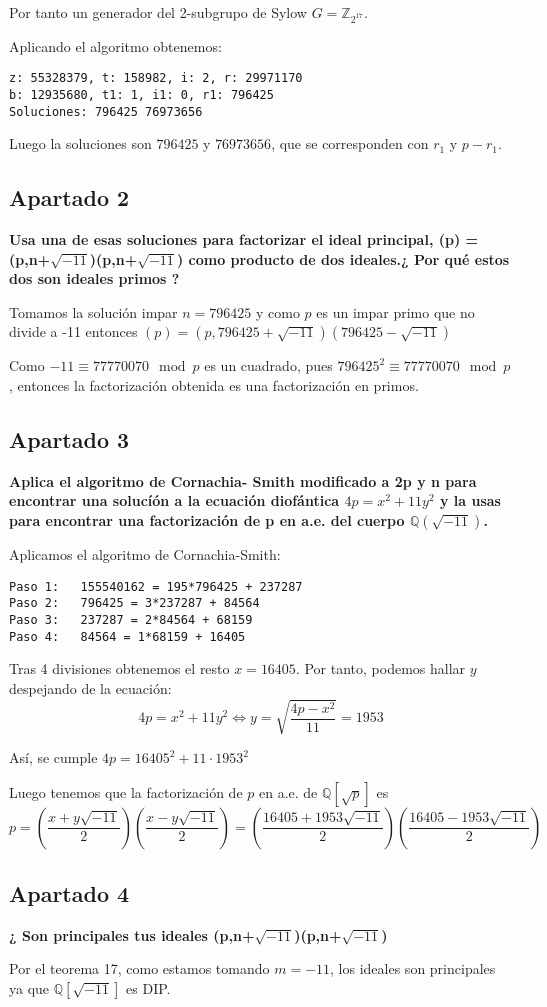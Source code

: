 \documentclass[a4paper]{article}
\begin{document}
Por tanto un generador del 2-subgrupo de Sylow $G=\mathbb{Z}_{2^{17}}$.

Aplicando el algoritmo obtenemos:

\begin{verbatim}
z: 55328379, t: 158982, i: 2, r: 29971170
b: 12935680, t1: 1, i1: 0, r1: 796425
Soluciones: 796425 76973656
\end{verbatim}

Luego la soluciones son $796425$ y $76973656$, que se corresponden con $r_1$ y $p-r_1$.

\subsection{Apartado 2}
\textbf{Usa una de esas soluciones para factorizar el ideal principal, (p) =(p,n+$\sqrt{-11}$)(p,n+$\sqrt{-11}$) como producto de dos ideales.¿ Por qué estos dos son ideales primos ?}

Tomamos la solución impar $n=796425$ y como $p$ es un impar primo que no divide a -11 entonces $(p)=\left(p, 796425+\sqrt{-11}\right)\left(796425-\sqrt{-11}\right)$

Como $-11\equiv 77770070 \mod p$ es un cuadrado, pues $796425^2\equiv 77770070 \mod p$, entonces la factorización obtenida es una factorización en primos.

\subsection{Apartado 3}
\textbf{Aplica el algoritmo de Cornachia- Smith modificado a 2p y n para encontrar una solucíón a la ecuación diofántica $4p =x^2 + 11y^2$ y la usas para encontrar una factorización de p en a.e. del cuerpo $\mathbb{Q}(\sqrt{-11})$.}

Aplicamos el algoritmo de Cornachia-Smith:

\begin{verbatim}
Paso 1:   155540162 = 195*796425 + 237287
Paso 2:   796425 = 3*237287 + 84564
Paso 3:   237287 = 2*84564 + 68159
Paso 4:   84564 = 1*68159 + 16405
\end{verbatim}

Tras 4 divisiones obtenemos el resto $x=16405$. Por tanto, podemos hallar $y$ despejando de la ecuación:
$$4p =x^2 + 11y^2  \Leftrightarrow y = \sqrt{\frac{4p-x^2}{11}}=1953$$

Así, se cumple  $4p = 16405^2+11\cdot 1953^2$

Luego tenemos que la factorización de $p$ en a.e. de $\mathbb{Q}[\sqrt{p}]$ es
$$p= \left( \frac{x+y\sqrt{-11}}{2}\right) \left( \frac{x-y\sqrt{-11}}{2}\right) = \left( \frac{16405+1953\sqrt{-11}}{2}\right) \left( \frac{16405-1953\sqrt{-11}}{2}\right)$$


\subsection{Apartado 4}
\textbf{¿ Son principales tus ideales (p,n+$\sqrt{-11}$)(p,n+$\sqrt{-11}$)}

Por el teorema 17, como estamos tomando $m=-11$, los ideales son principales ya que $\mathbb{Q}[\sqrt{-11}]$ es DIP.
\end{document}
